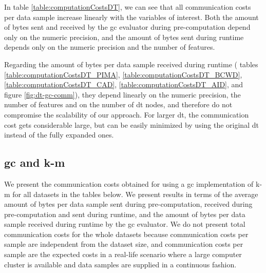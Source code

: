 In table \ref{table:computationCostsDT}, we can see that all communication costs per data sample increase linearly with the variables of interest. Both the amount of bytes sent and received by the \ac{gc} evaluator during pre-computation depend only on the numeric precision, and the amount of bytes sent during runtime depends only on the numeric precision and the number of features.

Regarding the amount of bytes per data sample received during runtime ( tables \ref{table:computationCostsDT_PIMA}, \ref{table:computationCostsDT_BCWD}, \ref{table:computationCostsDT_CAD}, \ref{table:computationCostsDT_AID}, and figure \ref{fig:dt-gc-comm}), they depend linearly on the numeric precision, the number of features and on the number of \ac{dt} nodes, and therefore do not compromise the scalability of our approach. For larger \ac{dt}, the communication cost gets considerable large, but can be easily minimized by using the original \ac{dt} instead of the fully expanded ones.




\subsection{\acl{gc} and \acl{k-m}}

We present the communication costs obtained for using a \ac{gc} implementation of \ac{k-m} for all datasets in the tables below. We present results in terms of the average amount of bytes per data sample sent during pre-computation, received during pre-computation and sent during runtime, and the amount of bytes per data sample received during runtime by the \ac{gc} evaluator. We do not present total communication costs for the whole datasets because communication costs per sample are independent from the dataset size, and communication costs per sample are the expected costs in a real-life scenario where a large computer cluster is available and data samples are supplied in a continuous fashion.


